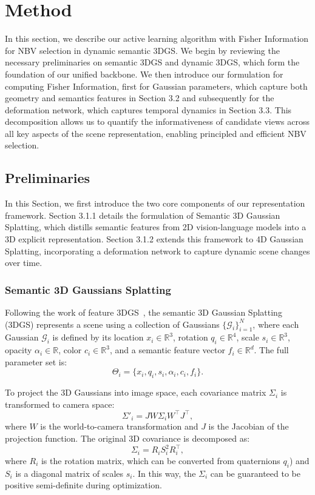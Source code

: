 \section{Method}
In this section, we describe our active learning algorithm with Fisher Information for NBV selection in dynamic semantic 3DGS. We begin by reviewing the necessary preliminaries on semantic 3DGS and dynamic 3DGS, which form the foundation of our unified backbone. We then introduce our formulation for computing Fisher Information, first for Gaussian parameters, which capture both geometry and semantics features in Section 3.2 and subsequently for the deformation network, which captures temporal dynamics in Section 3.3. This decomposition allows us to quantify the informativeness of candidate views across all key aspects of the scene representation, enabling principled and efficient NBV selection.

\subsection{Preliminaries}
In this Section, we first introduce the two core components of our representation framework. Section 3.1.1 details the formulation of Semantic 3D Gaussian Splatting, which distills semantic features from 2D vision-language models into a 3D explicit representation. Section 3.1.2 extends this framework to 4D Gaussian Splatting, incorporating a deformation network to capture dynamic scene changes over time. 

\subsubsection{Semantic 3D Gaussians Splatting}

Following the work of feature 3DGS~\cite{feature3dgs}, the semantic 3D Gaussian Splatting (3DGS) represents a scene using a collection of Gaussians \(\{\mathcal{G}_i\}_{i=1}^N\), where each Gaussian \(\mathcal{G}_i\) is defined by its location \(x_i \in \mathbb{R}^3\), rotation \(q_i \in \mathbb{R}^4\), scale \(s_i \in \mathbb{R}^3\), opacity \(\alpha_i \in \mathbb{R}\), color \(c_i \in \mathbb{R}^3\), and a semantic feature vector \(f_i \in \mathbb{R}^d\). The full parameter set is:
\[
\Theta_i = \{x_i, q_i, s_i, \alpha_i, c_i, f_i\}.
\]

To project the 3D Gaussians into image space, each covariance matrix \(\Sigma_i\) is transformed to camera space:
\begin{equation}
\Sigma'_i = J W \Sigma_i W^\top J^\top,
\end{equation}
where \(W\) is the world-to-camera transformation and \(J\) is the Jacobian of the projection function. The original 3D covariance is decomposed as:
\begin{equation}
\Sigma_i = R_i S_i^2 R_i^\top,
\end{equation}
where \(R_i\) is the rotation matrix, which can be converted from quaternions \(q_i\)) and \(S_i\) is a diagonal matrix of scales \(s_i\). In this way, the \(\Sigma_i\) can be guaranteed to be positive semi-definite during optimization.


